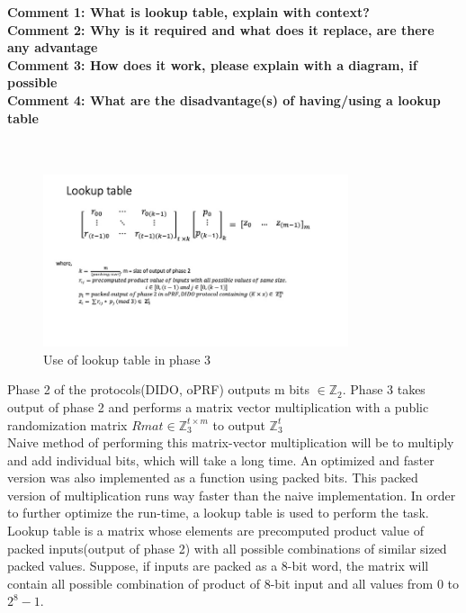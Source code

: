 \textbf{Comment 1: What is lookup table, explain with context?}\\
\textbf{Comment 2: Why is it required and what does it replace, are there any advantage}\\
\textbf{Comment 3: How does it work, please explain with a diagram, if possible}\\
\textbf{Comment 4: What are the disadvantage(s) of having/using a lookup table}\\ \\ \\ 

\begin{figure}[ht]
	\centering
	\includegraphics[width=0.8\textwidth]{images/lookup.jpg}
	\vspace{-2mm}
	\caption{Use of lookup table in phase 3}
	\label{oprf.fig}
	\vspace{-5mm}
\end{figure}

Phase 2 of the protocols(DIDO, oPRF) outputs m bits $\in \mathbb{Z}_2$. Phase 3 takes output of phase 2 and performs a matrix vector multiplication with a public randomization matrix $Rmat \in \mathbb{Z}_{3}^{t \times m} $ to output $\mathbb{Z}_{3}^{t} $\\
Naive method of performing this matrix-vector multiplication will be to multiply and add individual bits, which will take a long time. An optimized and faster version was also implemented as a function using packed bits. This packed version of multiplication runs way faster than the naive implementation. In order to further optimize the run-time, a lookup table is used to perform the task.\\

Lookup table is a matrix whose elements are precomputed product value of packed inputs(output of phase 2) with all possible combinations of similar sized packed values. Suppose, if inputs are packed as a 8-bit word, the matrix will contain all possible combination of product of 8-bit input and all values from 0 to $2^{8}-1$. \\

